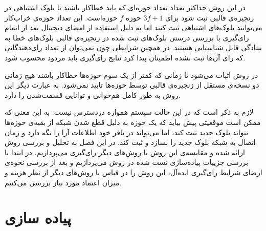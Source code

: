  \par
  در این روش حداکثر تعداد تعداد حوزه‌ای که باید خطاکار باشند تا بلوک اشتباهی در زنجیره‌ی قالبی ثبت شود برای 
$3f + 1$
حوزه $f$ حوزه‌است.
 این تعداد حوزه‌ی خراب‌کار می‌توانند بلوک‌های اشتباهی ثبت کنند اما به دلیل استفاده از امضای دیجیتال بعد از اتمام رای‌گیری با بررسی درستی بلوک‌های ثبت شده در زنجیره‌ی قالبی بلوک‌های خطا به سادگی قابل شناسیایی هستند. در همچین شرایطی چون نمی‌توان از تعداد رای‌دهندگانی که رای‌ آن‌ها ثبت نشده اطمینان پیدا کرد نتایج رای‌گیری باید مردود محسوب شود. 
 \par
 در روش  اثبات می‌شود 
 \cite{bftcap}
 تا زمانی که کمتر از یک سوم حوزه‌ها خطاکار باشند هیچ زمانی دو نسخه‌ی مستقل از زنجیره‌ی قالبی توسط حوزه‌ها تایید نمی‌شود. به عبارت دیگر این روش به طور کامل هم‌خوانی و توانایی قسمت‌شدن را دارد.
 \par
 لازم به ذکر است که در این حالت سیستم همواره دردسترس نیست. به این معنی که ممکن است موقعیتی پیش بیاید که یک حوزه به دلیل قطع شدن شبکه از بقیه‌ی حوزه‌ها نتواند بلوک جدید ثبت کند، اما می‌تواند در بافر خود اطلاعات آرا را نگه دارد و زمان اتصال به شبکه بلوک جدید را بسازد و ثبت کند.
در این فصل به تحلیل و بررسی روش ارائه شده و مقایسه‌ی این روش با روش‌های دیگر رای‌گیری می‌پردازیم. در ابتدا با بررسی جزییات پیاده‌سازی تست شده در روش می‌پردازیم و بعد از بررسی نحوه‌ی ارضای شرایط رای‌گیری ایده‌آل، این روش را در قیاس با روش‌های دیگر از نظر هزینه و میزان اعتماد مورد نیاز بررسی می‌کنیم. 
\par

\section{پیاده سازی}

